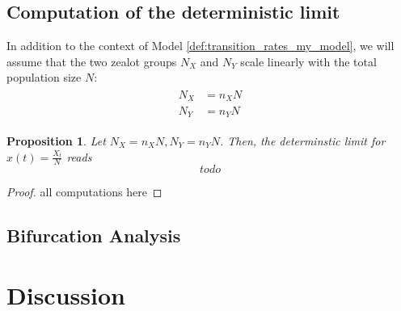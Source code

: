 \documentclass[12pt,a4paper,twoside]{article}
\newtheorem{prop}{Proposition}[section]
\begin{document}
\subsection{Computation of the deterministic limit}
In addition to the context of Model \ref{def:transition_rates_my_model}, we will assume that the two zealot groups $N_X$ and $N_Y$ scale linearly with the total population size $N$:
\begin{align}\label{eq:zealots_scale_linearly}
\begin{split}
N_X &= n_X N\\
N_Y &= n_Y N
\end{split}
\end{align}
\begin{prop}
	Let $N_X = n_X N, N_Y = n_Y N$. Then, the determinstic limit for $x\left(t\right) = \frac{X_t}{N}$ reads
	\begin{equation}
		todo
	\end{equation} 
\end{prop}
\begin{proof}
	all computations here
\end{proof}
\subsection{Bifurcation Analysis}
\section{Discussion}


\newpage
\printbibliography
\end{document}
